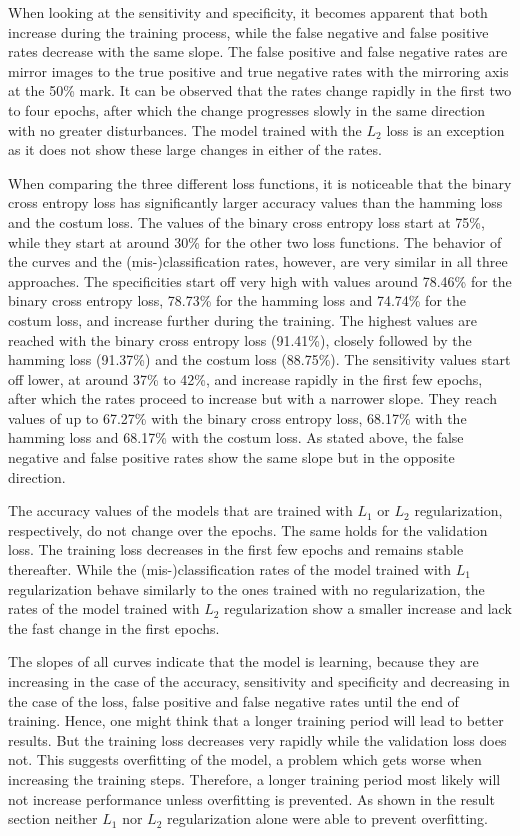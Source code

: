 When looking at the sensitivity and specificity, it becomes apparent that both increase during the training process, while the false negative and false positive rates decrease with the same slope. The false positive and false negative rates are mirror images to the true positive and true negative rates with the mirroring axis at the 50\% mark. It can be observed that the rates change rapidly in the first two to four epochs, after which the change progresses slowly in the same direction with no greater disturbances. The model trained with the \(L_2\) loss is an exception as it does not show these large changes in either of the rates.

\bigskip
When comparing the three different loss functions, it is noticeable that the binary cross entropy loss has significantly larger accuracy values than the hamming loss and the costum loss. The values of the binary cross entropy loss start at 75\%, while they start at around 30\% for the other two loss functions. The behavior of the curves and the (mis-)classification rates, however, are very similar in all three approaches. The specificities start off very high with values around 78.46\% for the binary cross entropy loss, 78.73\% for the hamming loss and 74.74\% for the costum loss, and increase further during the training. The highest values are reached with the binary cross entropy loss (91.41\%), closely followed by the hamming loss (91.37\%) and the costum loss (88.75\%). The sensitivity values start off lower, at around 37\% to 42\%, and increase rapidly in the first few epochs, after which the rates proceed to increase but with a narrower slope. They reach values of up to 67.27\% with the binary cross entropy loss, 68.17\% with the hamming loss and 68.17\% with the costum loss. As stated above, the false negative and false positive rates show the same slope but in the opposite direction.

The accuracy values of the models that are trained with \(L_1\) or \(L_2\) regularization, respectively, do not change over the epochs. The same holds for the validation loss. The training loss decreases in the first few epochs and remains stable thereafter.
While the (mis-)classification rates of the model trained with \(L_1\) regularization behave similarly to the ones trained with no regularization, the rates of the model trained with \(L_2\) regularization show a smaller increase and lack the fast change in the first epochs.

The slopes of all curves indicate that the model is learning, because they are increasing in the case of the accuracy, sensitivity and specificity and decreasing in the case of the loss, false positive and false negative rates until the end of training. Hence, one might think that a longer training period will lead to better results. But the training loss decreases very rapidly while the validation loss does not. This suggests overfitting of the model, a problem which gets worse when increasing the training steps. Therefore, a longer training period most likely will not increase performance unless overfitting is prevented. As shown in the result section neither \(L_1\) nor \(L_2\) regularization alone were able to prevent overfitting.

